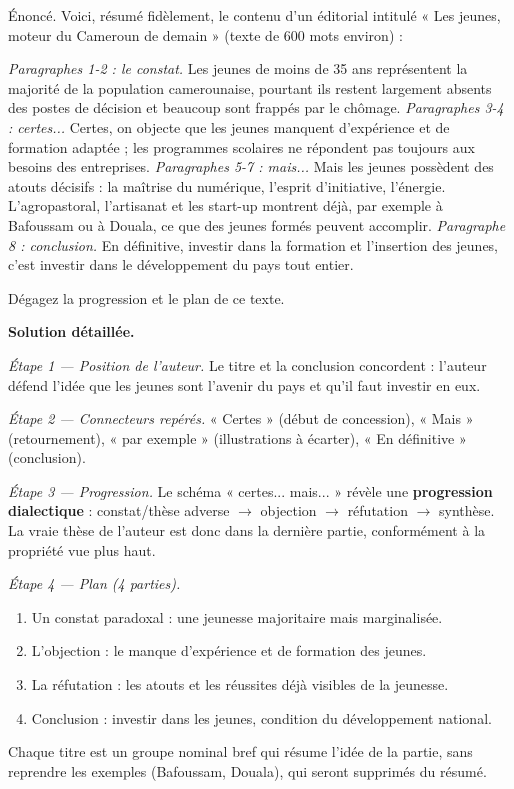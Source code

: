\documentclass[11pt]{article}
\begin{document}
\begin{exoresolu}
Énoncé. Voici, résumé fidèlement, le contenu d'un éditorial intitulé « Les jeunes, moteur du Cameroun de demain » (texte de 600 mots environ) :

\emph{Paragraphes 1-2 : le constat.} Les jeunes de moins de 35 ans représentent la majorité de la population camerounaise, pourtant ils restent largement absents des postes de décision et beaucoup sont frappés par le chômage. \emph{Paragraphes 3-4 : certes...} Certes, on objecte que les jeunes manquent d'expérience et de formation adaptée ; les programmes scolaires ne répondent pas toujours aux besoins des entreprises. \emph{Paragraphes 5-7 : mais...} Mais les jeunes possèdent des atouts décisifs : la maîtrise du numérique, l'esprit d'initiative, l'énergie. L'agropastoral, l'artisanat et les start-up montrent déjà, par exemple à Bafoussam ou à Douala, ce que des jeunes formés peuvent accomplir. \emph{Paragraphe 8 : conclusion.} En définitive, investir dans la formation et l'insertion des jeunes, c'est investir dans le développement du pays tout entier.

Dégagez la progression et le plan de ce texte.

\tcblower
\textbf{Solution détaillée.}

\emph{Étape 1 — Position de l'auteur.} Le titre et la conclusion concordent : l'auteur défend l'idée que les jeunes sont l'avenir du pays et qu'il faut investir en eux.

\emph{Étape 2 — Connecteurs repérés.} « Certes » (début de concession), « Mais » (retournement), « par exemple » (illustrations à écarter), « En définitive » (conclusion).

\emph{Étape 3 — Progression.} Le schéma « certes... mais... » révèle une \textbf{progression dialectique} : constat/thèse adverse $\rightarrow$ objection $\rightarrow$ réfutation $\rightarrow$ synthèse. La vraie thèse de l'auteur est donc dans la dernière partie, conformément à la propriété vue plus haut.

\emph{Étape 4 — Plan (4 parties).}
\begin{enumerate}
\item Un constat paradoxal : une jeunesse majoritaire mais marginalisée.
\item L'objection : le manque d'expérience et de formation des jeunes.
\item La réfutation : les atouts et les réussites déjà visibles de la jeunesse.
\item Conclusion : investir dans les jeunes, condition du développement national.
\end{enumerate}
Chaque titre est un groupe nominal bref qui résume l'idée de la partie, sans reprendre les exemples (Bafoussam, Douala), qui seront supprimés du résumé.
\end{exoresolu}
\end{document}

